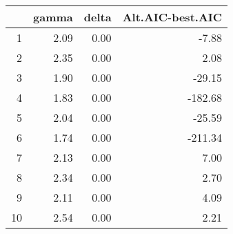 \begin{table}[ht]
\centering
\begin{tabular}{rrrr}
  \hline
 & gamma & delta & Alt.AIC-best.AIC \\ 
  \hline
1 & 2.09 & 0.00 & -7.88 \\ 
  2 & 2.35 & 0.00 & 2.08 \\ 
  3 & 1.90 & 0.00 & -29.15 \\ 
  4 & 1.83 & 0.00 & -182.68 \\ 
  5 & 2.04 & 0.00 & -25.59 \\ 
  6 & 1.74 & 0.00 & -211.34 \\ 
  7 & 2.13 & 0.00 & 7.00 \\ 
  8 & 2.34 & 0.00 & 2.70 \\ 
  9 & 2.11 & 0.00 & 4.09 \\ 
  10 & 2.54 & 0.00 & 2.21 \\ 
   \hline
\end{tabular}
\end{table}
